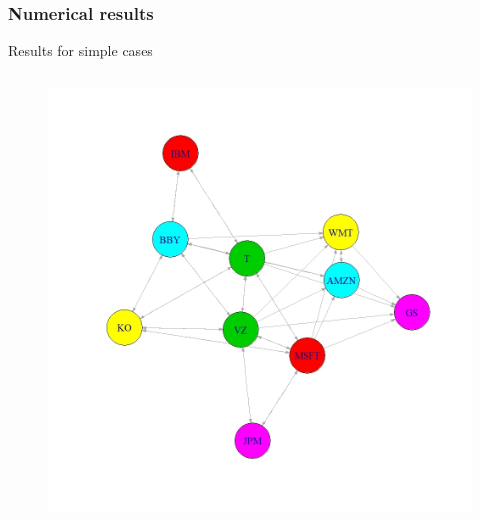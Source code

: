 \documentclass[xcolor={x11names,svgnames,dvipsnames}]{beamer}
\begin{document}
\begin{frame}
\frametitle{Numerical results}

\begin{block}{Results for simple cases}
\begin{columns}
\column{1.5in}
\begin{figure}
     \includegraphics[width=1\textwidth, height=0.5\textheight]{10stocks.jpeg}
\end{figure}


\end{columns}
\end{block}
\end{frame}
\end{document}
